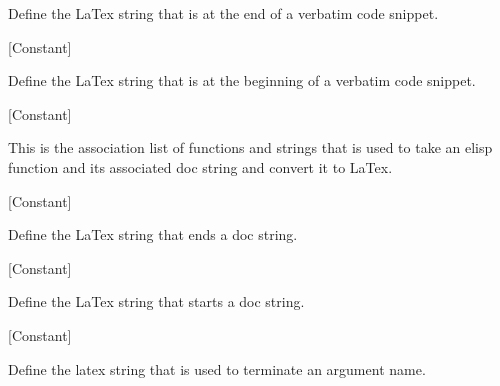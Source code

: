 \begin{doc-string}
Define the LaTex string that is at the end of a verbatim
code snippet.
\end{doc-string}

\vspace{1em}
\noindent
{}
\usebox{\funcname}
 \hfill [Constant]

\begin{doc-string}
Define the LaTex string that is at the beginning of a verbatim
code snippet.
\end{doc-string}

\vspace{1em}
\noindent
{}
\usebox{\funcname}
 \hfill [Constant]

\begin{doc-string}
This is the association list of functions and strings that is used to take an elisp
function and its associated doc string and convert it to LaTex.
\end{doc-string}

\vspace{1em}
\noindent
{}
\usebox{\funcname}
 \hfill [Constant]

\begin{doc-string}
Define the LaTex string that ends a doc string.
\end{doc-string}

\vspace{1em}
\noindent
{}
\usebox{\funcname}
 \hfill [Constant]

\begin{doc-string}
Define the LaTex string that starts a doc string.
\end{doc-string}

\vspace{1em}
\noindent
{}
\usebox{\funcname}
 \hfill [Constant]

\begin{doc-string}
Define the latex string that is used to terminate an argument name.
\end{doc-string}


